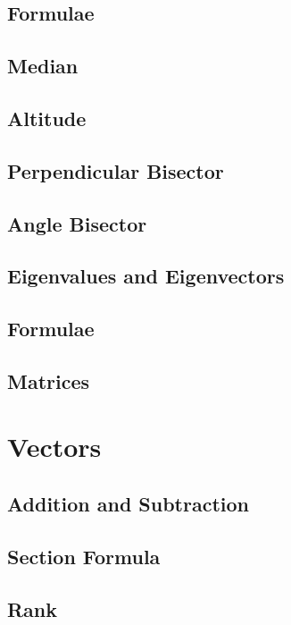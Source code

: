 \documentclass[journal]{IEEEtran}
\begin{document}
\subsection{Formulae}

\subsection{Median}

\subsection{Altitude}

\subsection{Perpendicular Bisector}

\subsection{Angle Bisector}

\subsection{Eigenvalues and Eigenvectors}

\subsection{Formulae}

\subsection{Matrices}

\newpage
\section{Vectors}
\subsection{Addition and Subtraction}

\subsection{Section Formula}

\subsection{Rank}

\end{document}
